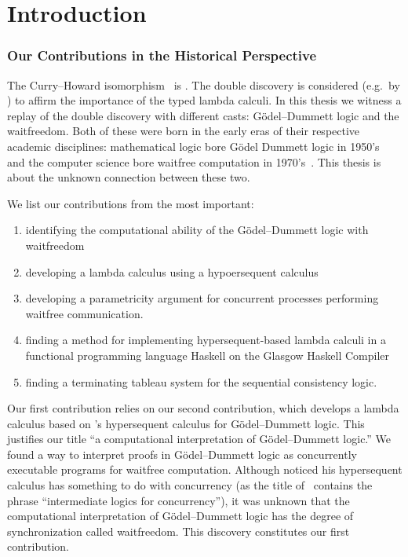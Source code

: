 \chapter{Introduction}

\subsection{Our Contributions in the Historical Perspective}

The Curry--Howard isomorphism~\citep{curryhoward} is .
The double discovery is considered (e.g.~by \citet{wadler2012propositions})
to affirm the importance of the typed lambda calculi.
In this thesis we witness a replay of the double discovery with
different casts: G\"odel--Dummett logic and the waitfreedom.
Both of these were born in the early eras of their respective academic
disciplines:
mathematical logic bore G\"odel Dummett logic in
1950's~\citep{dummett59}
and the
computer science bore waitfree computation in
1970's~\citep{lamport1979make}.
This thesis is about the unknown connection between these two.

We list our contributions from the most important:
\begin{enumerate}
 \item identifying the computational ability of the
G\"odel--Dummett logic with waitfreedom
 \item developing a lambda calculus using
       a hypoersequent calculus
 \item developing a parametricity argument for
       concurrent processes performing waitfree communication.
 \item finding a method for implementing hypersequent-based lambda calculi in a
       functional programming language Haskell on the Glasgow Haskell
       Compiler
 \item finding a terminating tableau system for the sequential
       consistency logic.
\end{enumerate}

Our first contribution relies on our second contribution, which
develops a lambda calculus based on \citet{avron91}'s hypersequent
calculus for G\"odel--Dummett logic.  This justifies our title ``a
computational interpretation of G\"odel--Dummett logic.''
We found a way to interpret proofs in G\"odel--Dummett logic as
concurrently executable programs for waitfree computation.
Although \citet{avron91} noticed his hypersequent calculus has something
to do with concurrency (as the title of~\citep{avron91} contains the phrase
``intermediate logics for concurrency''), it was unknown that
the computational interpretation of G\"odel--Dummett logic has
the degree of synchronization called waitfreedom.  This discovery
constitutes our first contribution.

